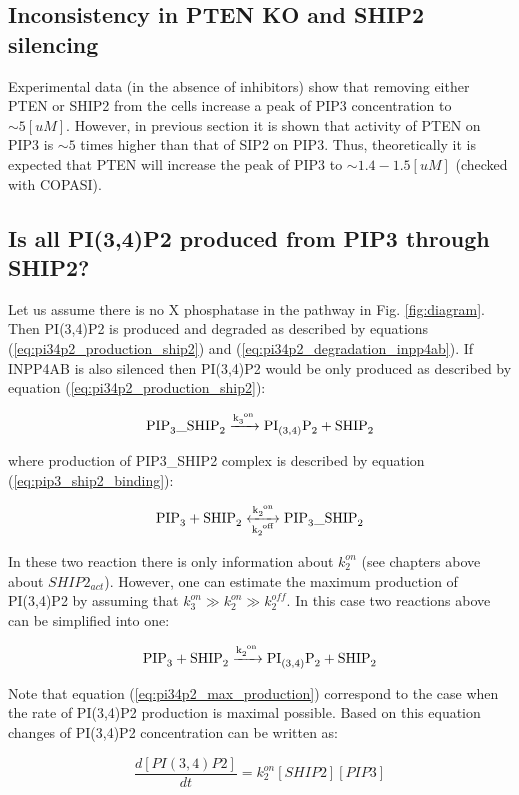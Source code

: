 \documentclass[12pt]{article} %
\begin{document}
\subsection{Inconsistency in PTEN KO and SHIP2 silencing} %
Experimental data (in the absence of inhibitors) show that removing either PTEN or SHIP2 from the cells increase a peak of PIP3 concentration to \(\sim5 [uM]\). However, in previous section it is shown that activity of PTEN on PIP3 is \(\sim 5\) times higher than that of SIP2 on PIP3. Thus, theoretically it is expected that PTEN will increase the peak of PIP3 to \(\sim1.4-1.5 [uM]\) (checked with COPASI).

\subsection{Is all PI(3,4)P2 produced from PIP3 through SHIP2?} %

Let us assume there is no X phosphatase in the pathway in Fig. \ref{fig:diagram}. Then PI(3,4)P2 is produced and degraded as described by equations (\ref{eq:pi34p2_production_ship2}) and (\ref{eq:pi34p2_degradation_inpp4ab}). If INPP4AB is also silenced then PI(3,4)P2 would be only produced as described by equation (\ref{eq:pi34p2_production_ship2}):

\[\ce{PIP3\_SHIP2 ->[\ce{k_3^{on}}] PI_{(3,4)}P2 + SHIP2}\]

where production of PIP3\_SHIP2 complex is described by equation (\ref{eq:pip3_ship2_binding}):

\[\ce{PIP3 + SHIP2 <->[\ce{k_2^{on}}][\ce{k_2^{off}}] PIP3\_SHIP2}\]

In these two reaction there is only information about \(k_2^{on}\) (see chapters above about \(SHIP2_{act}\)). However, one can estimate the maximum production of PI(3,4)P2 by assuming that \(k_3^{on} \gg k_2^{on} \gg k_2^{off}\). In this case two reactions above can be simplified into one:

\begin{equation}
 \ce{PIP3 + SHIP2 ->[\ce{k_2^{on}}] PI_{(3,4)}P2 + SHIP2}
 \label{eq:pi34p2_max_production}
\end{equation}

Note that equation (\ref{eq:pi34p2_max_production}) correspond to the case when the rate of PI(3,4)P2 production is maximal possible. Based on this equation changes of PI(3,4)P2 concentration can be written as:

\[
 \frac{d [PI(3,4)P2]}{d t} = k_2^{on}[SHIP2][PIP3]
\]
\end{document}
